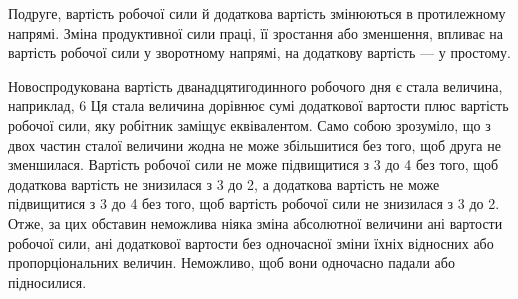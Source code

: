 Подруге, вартість робочої сили й додаткова вартість змінюються
в протилежному напрямі. Зміна продуктивної сили праці,
її зростання або зменшення, впливає на вартість робочої сили у
зворотному напрямі, на додаткову вартість — у простому.

Новоспродукована вартість дванадцятигодинного робочого
дня є стала величина, наприклад, 6 Ця стала величина
дорівнює сумі додаткової вартости плюс вартість робочої сили,
яку робітник заміщує еквівалентом. Само собою зрозуміло, що
з двох частин сталої величини жодна не може збільшитися без
того, щоб друга не зменшилася. Вартість робочої сили не може
підвищитися з 3 до 4 без того, щоб додаткова вартість
не знизилася з 3 до 2, а додаткова вартість не може
підвищитися з 3 до 4 без того, щоб вартість робочої
сили не знизилася з 3 до 2. Отже, за цих обставин неможлива
ніяка зміна абсолютної величини ані вартости робочої
сили, ані додаткової вартости без одночасної зміни їхніх відносних
або пропорціональних величин. Неможливо, щоб вони одночасно
падали або підносилися.
